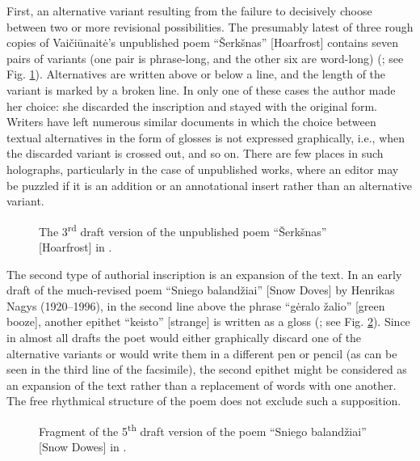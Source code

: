 \begin{paper}
First, an alternative variant resulting from the failure to decisively choose between two or more revisional possibilities. 
The presumably latest of three rough copies of Vaičiūnaitė's unpublished poem
``Šerkšnas'' {[}Hoarfrost{]} contains seven pairs of variants (one pair
is phrase-long, and the other six are word-long) (\citealt[11r]{vaiciunaite_serksnas_1967}; see Fig. \ref{fig:subacius9}). Alternatives are written above or below a line, and the
length of the variant is marked by a broken line. In only one of these
cases the author made her choice: she discarded the inscription and
stayed with the original form. Writers have left numerous similar
documents in which the choice between textual alternatives in the form
of glosses is not expressed graphically, i.e., when the discarded
variant is crossed out, and so on. There are few places in such
holographs, particularly in the case of unpublished works, where an
editor may be puzzled if it is an addition or an annotational insert
rather than an alternative variant.
\vfill
\begin{figure}[H]
    \centering
    \caption{The 3\textsuperscript{rd} draft version of the unpublished poem ``Šerkšnas'' {[}Hoarfrost{]} in \citealt[11r]{vaiciunaite_serksnas_1967}.}
    \label{fig:subacius9}
\end{figure}
\newpage

The second type of authorial inscription is an expansion of the text. In an early draft of the much-revised poem ``Sniego balandžiai'' {[}Snow Doves{]} by Henrikas Nagys (1920--1996), in the second line above the phrase ``gėralo žalio'' {[}green booze{]},
another epithet ``keisto'' {[}strange{]} is written as a gloss (\citealt[33v]{nagys_sniego_1951}; see Fig. \ref{fig:subacius10}). Since in almost all drafts the poet would
either graphically discard one of the alternative variants or would
write them in a different pen or pencil (as can be seen in the third
line of the facsimile), the second epithet might be considered as an
expansion of the text rather than a replacement of words with one
another. The free rhythmical structure of the poem does not exclude such
a supposition.

\begin{figure}[H]
    \centering
    \caption{Fragment of the 5\textsuperscript{th} draft version of the poem ``Sniego balandžiai'' {[}Snow Dowes{]} in \citealt[33v]{nagys_sniego_1951}.}
    \label{fig:subacius10}
\end{figure}


\end{paper}
